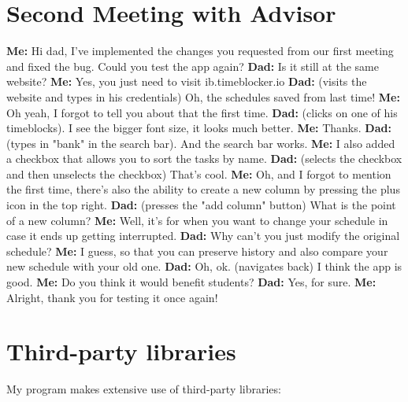 \documentclass[12pt]{report}
\begin{document}
\section*{Second Meeting with Advisor}
\textbf{Me:} Hi dad, I've implemented the changes you requested from our first meeting and fixed the bug. Could you test the app again?
\textbf{Dad:} Is it still at the same website?
\textbf{Me:} Yes, you just need to visit ib.timeblocker.io
\textbf{Dad:} (visits the website and types in his credentials) Oh, the schedules saved from last time!
\textbf{Me:} Oh yeah, I forgot to tell you about that the first time.
\textbf{Dad:} (clicks on one of his timeblocks). I see the bigger font size, it looks much better.
\textbf{Me:} Thanks.
\textbf{Dad:} (types in "bank" in the search bar). And the search bar works.
\textbf{Me:} I also added a checkbox that allows you to sort the tasks by name.
\textbf{Dad:} (selects the checkbox and then unselects the checkbox) That's cool.
\textbf{Me:} Oh, and I forgot to mention the first time, there's also the ability to create a new column by pressing the plus icon in the top right.
\textbf{Dad:} (presses the "add column" button) What is the point of a new column?
\textbf{Me:} Well, it's for when you want to change your schedule in case it ends up getting interrupted.
\textbf{Dad:} Why can't you just modify the original schedule?
\textbf{Me:} I guess, so that you can preserve history and also compare your new schedule with your old one.
\textbf{Dad:} Oh, ok. (navigates back) I think the app is good.
\textbf{Me:} Do you think it would benefit students?
\textbf{Dad:} Yes, for sure.
\textbf{Me:} Alright, thank you for testing it once again!
\egroup


\section*{Third-party libraries}
My program makes extensive use of third-party libraries:
\end{document}
